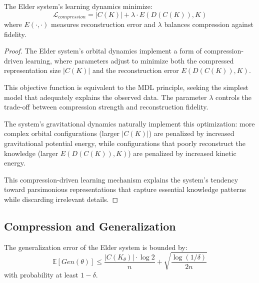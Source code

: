 \begin{theorem}
The Elder system's learning dynamics minimize:
\begin{equation}
\mathcal{L}_{compression} = |C(K)| + \lambda \cdot E(D(C(K)), K)
\end{equation}
where $E(\cdot,\cdot)$ measures reconstruction error and $\lambda$ balances compression against fidelity.
\end{theorem}

\begin{proof}
The Elder system's orbital dynamics implement a form of compression-driven learning, where parameters adjust to minimize both the compressed representation size $|C(K)|$ and the reconstruction error $E(D(C(K)), K)$.

This objective function is equivalent to the MDL principle, seeking the simplest model that adequately explains the observed data. The parameter $\lambda$ controls the trade-off between compression strength and reconstruction fidelity.

The system's gravitational dynamics naturally implement this optimization: more complex orbital configurations (larger $|C(K)|$) are penalized by increased gravitational potential energy, while configurations that poorly reconstruct the knowledge (larger $E(D(C(K)), K)$) are penalized by increased kinetic energy.

This compression-driven learning mechanism explains the system's tendency toward parsimonious representations that capture essential knowledge patterns while discarding irrelevant details.
\end{proof}

\subsection{Compression and Generalization}

\begin{theorem}
The generalization error of the Elder system is bounded by:
\begin{equation}
\mathbb{E}[Gen(\theta)] \leq \frac{|C(K_{\theta})| \cdot \log 2}{n} + \sqrt{\frac{\log(1/\delta)}{2n}}
\end{equation}
with probability at least $1-\delta$.
\end{theorem}

